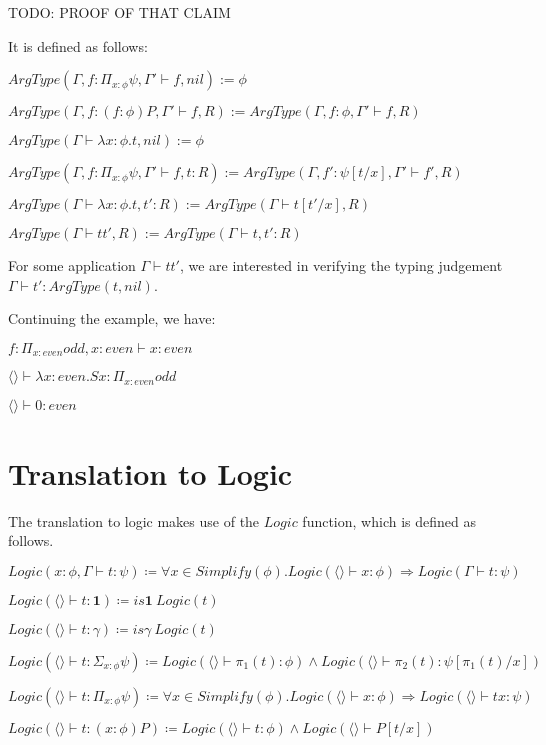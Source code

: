 \documentclass[12pt,a4paper,titlepage]{article}
\newcommand{\lnc}[1]{Logic(\langle \rangle \vdash #1)}
\begin{document}
    TODO: PROOF OF THAT CLAIM

    It is defined as follows:

    $ArgType(\Gamma, f: \Pi_{x: \phi} \psi, \Gamma' \vdash f, nil) := \phi$

    $ArgType(\Gamma, f: (f: \phi)P, \Gamma' \vdash f, R) := ArgType(\Gamma, f: \phi, \Gamma' \vdash f, R)$

    $ArgType(\Gamma \vdash \lambda x: \phi . t, nil) := \phi$

    $ArgType(\Gamma, f: \Pi_{x: \phi} \psi, \Gamma' \vdash f, t : R) := ArgType(\Gamma, f': \psi[t / x], \Gamma' \vdash f', R)$

    $ArgType(\Gamma \vdash \lambda x: \phi . t, t' : R) := ArgType(\Gamma \vdash t[t'/x], R)$

    $ArgType(\Gamma \vdash t t', R) := ArgType(\Gamma \vdash t, t' : R)$

    For some application $\Gamma \vdash t t'$, we are interested in verifying the typing judgement $\Gamma \vdash t': ArgType(t, nil)$.

    Continuing the example, we have:

    $f: \Pi_{x: even} odd, x: even \vdash x: even$

    $\langle \rangle \vdash \lambda x: even . S x: \Pi_{x: even} odd$

    $\langle \rangle \vdash 0: even$

    \section{Translation to Logic}

    The translation to logic makes use of the $Logic$ function, which is defined as follows.

    $Logic(x: \phi, \Gamma \vdash t: \psi) \coloneqq
    \forall x \in Simplify(\phi) . \lnc{x: \phi} \Rightarrow Logic(\Gamma \vdash t: \psi)$

    $\lnc{t: \textbf{1}} \coloneqq is\textbf{1}\ Logic(t)$

    $\lnc{t: \gamma} \coloneqq is\gamma\ Logic(t)$

    $\lnc{t: \Sigma_{x: \phi} \psi} \coloneqq \lnc{\pi_1 (t) : \phi} \land \lnc{\pi_2 (t): \psi[\pi_1 (t) / x]}$

    $\lnc{t: \Pi_{x: \phi} \psi} \coloneqq \forall x \in Simplify(\phi) . \lnc{x: \phi} \Rightarrow \lnc{tx: \psi}$

    $\lnc{t: (x: \phi)P} \coloneqq \lnc{t: \phi} \land \lnc{P[t/x]}$
\end{document}

